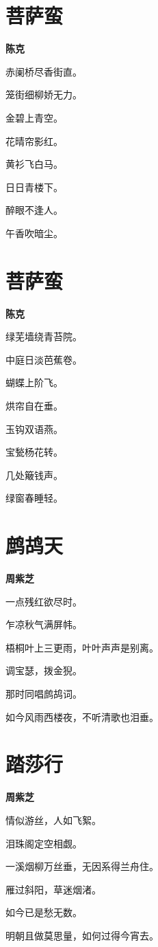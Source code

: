 \documentclass[12pt,a4paper]{ctexbook}
\begin{document}
\section{菩萨蛮}
\textbf{陈克}\par\vspace{0.5em}
赤阑桥尽香街直。\par
笼街细柳娇无力。\par
金碧上青空。\par
花晴帘影红。\par
黄衫飞白马。\par
日日青楼下。\par
醉眼不逢人。\par
午香吹暗尘。\par

\section{菩萨蛮}
\textbf{陈克}\par\vspace{0.5em}
绿芜墙绕青苔院。\par
中庭日淡芭蕉卷。\par
蝴蝶上阶飞。\par
烘帘自在垂。\par
玉钩双语燕。\par
宝甃杨花转。\par
几处簸钱声。\par
绿窗春睡轻。\par

\section{鹧鸪天}
\textbf{周紫芝}\par\vspace{0.5em}
一点残红欲尽时。\par
乍凉秋气满屏帏。\par
梧桐叶上三更雨，叶叶声声是别离。\par
调宝瑟，拨金猊。\par
那时同唱鹧鸪词。\par
如今风雨西楼夜，不听清歌也泪垂。\par

\section{踏莎行}
\textbf{周紫芝}\par\vspace{0.5em}
情似游丝，人如飞絮。\par
泪珠阁定空相觑。\par
一溪烟柳万丝垂，无因系得兰舟住。\par
雁过斜阳，草迷烟渚。\par
如今已是愁无数。\par
明朝且做莫思量，如何过得今宵去。\par
\end{document}
